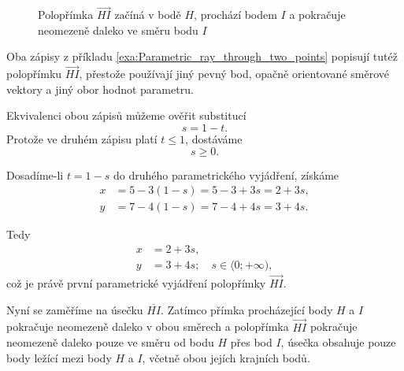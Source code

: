 \begin{figure}[H]
    \centering
    \caption{Polopřímka $\overrightarrow{HI}$ začíná v bodě $H$, prochází bodem $I$ a pokračuje neomezeně daleko ve směru bodu $I$}
    \label{fig:Parametric_ray_HI}
\end{figure}

Oba zápisy z příkladu
\ref{exa:Parametric_ray_through_two_points} popisují tutéž polopřímku
$\overrightarrow{HI}$, přestože používají jiný pevný bod, opačně
orientované směrové vektory a jiný obor hodnot parametru.

Ekvivalenci obou zápisů můžeme ověřit substitucí
\[
    s=1-t.
\]
Protože ve druhém zápisu platí $t\leq 1$, dostáváme
\[
    s\geq 0.
\]

Dosadíme-li $t=1-s$ do druhého parametrického vyjádření, získáme
\begin{align*}
    x &= 5-3(1-s)
       =5-3+3s
       =2+3s,\\
    y &= 7-4(1-s)
       =7-4+4s
       =3+4s.
\end{align*}

Tedy
\begin{align*}
    x &= 2+3s,\\
    y &= 3+4s;
    \quad s\in\langle0;+\infty),
\end{align*}
což je právě první parametrické vyjádření polopřímky
$\overrightarrow{HI}$.


Nyní se zaměříme na úsečku $\overline{HI}$. Zatímco přímka procházející
body $H$ a $I$ pokračuje neomezeně daleko v obou směrech a polopřímka
$\overrightarrow{HI}$ pokračuje neomezeně daleko pouze ve směru od bodu
$H$ přes bod $I$, úsečka obsahuje pouze body ležící mezi body $H$ a $I$,
včetně obou jejích krajních bodů.

